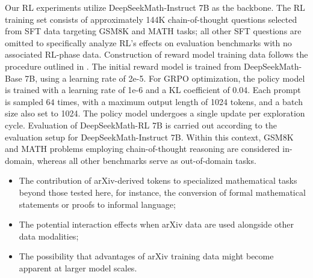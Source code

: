Our RL experiments utilize DeepSeekMath-Instruct 7B as the backbone. The RL training set consists of approximately 144K chain-of-thought questions selected from SFT data targeting GSM8K and MATH tasks; all other SFT questions are omitted to specifically analyze RL’s effects on evaluation benchmarks with no associated RL-phase data. Construction of reward model training data follows the procedure outlined in \citep{wang2023math}. The initial reward model is trained from DeepSeekMath-Base 7B, using a learning rate of 2e-5. For GRPO optimization, the policy model is trained with a learning rate of 1e-6 and a KL coefficient of 0.04. Each prompt is sampled $64$ times, with a maximum output length of 1024 tokens, and a batch size also set to 1024. The policy model undergoes a single update per exploration cycle. Evaluation of DeepSeekMath-RL 7B is carried out according to the evaluation setup for DeepSeekMath-Instruct 7B. Within this context, GSM8K and MATH problems employing chain-of-thought reasoning are considered in-domain, whereas all other benchmarks serve as out-of-domain tasks.

\begin{itemize}[topsep=0pt]
    \item The contribution of arXiv-derived tokens to specialized mathematical tasks beyond those tested here, for instance, the conversion of formal mathematical statements or proofs to informal language;
    \item The potential interaction effects when arXiv data are used alongside other data modalities;
    \item The possibility that advantages of arXiv training data might become apparent at larger model scales.
\end{itemize}


\begin{abstract}
Language models often encounter considerable difficulties with mathematical reasoning, primarily due to its inherently intricate and highly structured characteristics. This study presents DeepSeekMath~7B, a model developed by extending the pre-training of DeepSeek-Coder-Base-v1.5 7B utilizing 120B math-focused tokens extracted from Common Crawl, along with supplementary data from natural language and programming sources. Remarkably, DeepSeekMath~7B attains a 51.7\% accuracy rate on the competitive MATH benchmark without resorting to auxiliary tools or ensemble methods, thus nearing the performance of leading proprietary systems such as Gemini-Ultra and GPT-4. Utilizing self-consistency sampling (64 outputs), DeepSeekMath~7B further improves to 60.9\% on the MATH dataset. The advances in mathematical reasoning found in DeepSeekMath~stem from two principal innovations: First, we exploit the vast repository of open web data through a rigorously crafted data filtration and selection methodology. Second, we propose Group Relative Policy Optimization (GRPO)—a modification of Proximal Policy Optimization (PPO)—which not only bolsters mathematical problem-solving skills but also reduces the memory footprint typically associated with PPO.
\end{abstract}

